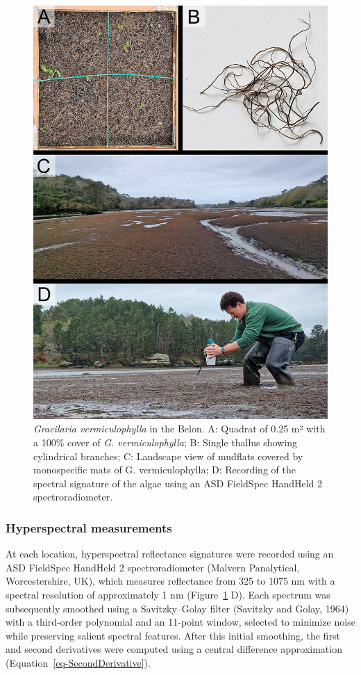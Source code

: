 \documentclass[
  letterpaper,
  11pt,
  english,
  singlespacing,
  headsepline]{MastersDoctoralThesis}
\begin{document}
\begin{spacing}{1.5}
\begin{figure}
{\includegraphics[width=0.95\linewidth,height=\textheight,keepaspectratio]{Chapter4/Figs/FigurePictures.png}

}

\caption{\label{fig-PictureFigure_G}\emph{Gracilaria vermiculophylla} in
the Belon. A: Quadrat of 0.25 m² with a 100\% cover of \emph{G.
vermiculophylla}; B: Single thallus showing cylindrical branches; C:
Landscape view of mudflats covered by monospecific mats of G.
vermiculophylla; D: Recording of the spectral signature of the algae
using an ASD FieldSpec HandHeld 2 spectroradiometer.}

\end{figure}%

\subsubsection{Hyperspectral
measurements}\label{hyperspectral-measurements}

At each location, hyperspectral reflectance signatures were recorded
using an ASD FieldSpec HandHeld 2 spectroradiometer (Malvern
Panalytical, Worcestershire, UK), which measures reflectance from 325 to
1075 nm with a spectral resolution of approximately 1 nm
(Figure~\ref{fig-PictureFigure_G} D). Each spectrum was subsequently
smoothed using a Savitzky--Golay filter (Savitzky and Golay, 1964) with
a third-order polynomial and an 11-point window, selected to minimize
noise while preserving salient spectral features. After this initial
smoothing, the first and second derivatives were computed using a
central difference approximation (Equation~\ref{eq-SecondDerivative}).


\end{spacing}
\end{document}
